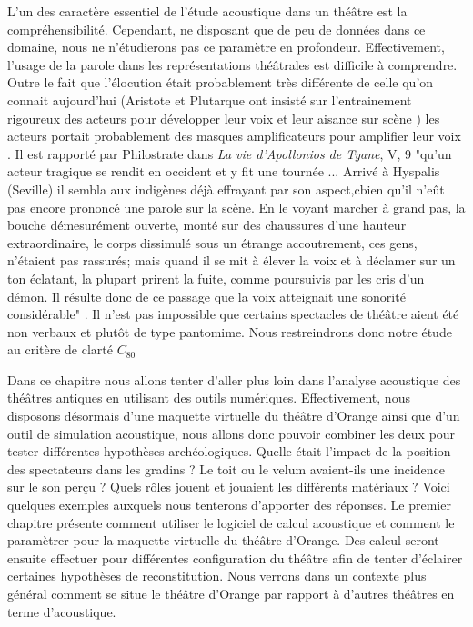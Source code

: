 L'un des caractère essentiel de l'étude acoustique dans un théâtre est la compréhensibilité. Cependant, ne disposant que de peu de données dans ce domaine, nous ne n'étudierons pas ce paramètre en profondeur. Effectivement, l'usage de la parole dans les représentations théâtrales est difficile à comprendre. Outre le fait que l'élocution était probablement très différente de celle qu'on connait aujourd'hui (Aristote \cite[Chap IV - XIV]{aristote} et Plutarque ont insisté sur l'entrainement rigoureux des acteurs pour développer leur voix et leur aisance sur scène \cite[p.39]{canac}) les acteurs portait probablement des masques amplificateurs pour amplifier leur voix \cite[p.362]{arnaud}. Il est rapporté par Philostrate dans \textit{La vie d'Apollonios de Tyane}, V, 9 "qu'un acteur tragique se rendit en occident et y fit une tournée ... Arrivé à Hyspalis (Seville) il sembla aux indigènes déjà effrayant par son aspect,cbien qu'il n'eût pas encore prononcé une parole sur la scène. En le voyant marcher à grand pas, la bouche démesurément ouverte, monté sur des chaussures d'une hauteur extraordinaire, le corps dissimulé sous un étrange accoutrement, ces gens, n'étaient pas rassurés; mais quand il se mit à élever la voix et à déclamer sur un ton éclatant, la plupart prirent la fuite, comme poursuivis par les cris d'un démon. Il résulte donc de ce passage que la voix atteignait une sonorité considérable" \cite[p.43]{formige}. Il n'est pas impossible que certains spectacles de théâtre aient été non verbaux et plutôt de type pantomime. Nous restreindrons donc notre étude au critère de clarté $C_{80}$

Dans ce chapitre nous allons tenter d'aller plus loin dans l'analyse acoustique des théâtres antiques en utilisant des outils numériques. Effectivement, nous disposons désormais d'une maquette virtuelle du théâtre d'Orange ainsi que d'un outil de simulation acoustique, nous allons donc pouvoir combiner les deux pour tester différentes hypothèses archéologiques. Quelle était l'impact de la position des spectateurs dans les gradins ? Le toit ou le \gls{velum} avaient-ils une incidence sur le son perçu ? Quels rôles jouent et jouaient les différents matériaux ? Voici quelques exemples auxquels nous tenterons d'apporter des réponses. Le premier chapitre présente comment utiliser le logiciel de calcul acoustique et comment le paramètrer pour la maquette virtuelle du théâtre d'Orange. Des calcul seront ensuite effectuer pour différentes configuration du théâtre afin de tenter d'éclairer certaines hypothèses de reconstitution. Nous verrons dans un contexte plus général comment se situe le théâtre d'Orange par rapport à d'autres théâtres en terme d'acoustique.	
	

